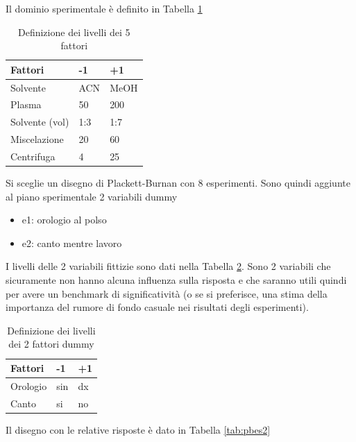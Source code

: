 \documentclass[
  11pt,
]{book}
\providecommand{\tightlist}{%
  \setlength{\itemsep}{0pt}\setlength{\parskip}{0pt}}
\begin{document}
Il dominio sperimentale è definito in Tabella \ref{tab:pbliv1}
\newpage

\begin{table}

\caption{\label{tab:pbliv1}Definizione dei livelli dei 5 fattori}
\centering
\begin{tabular}[t]{l|l|l}
\hline
Fattori & -1 & +1\\
\hline
Solvente & ACN & MeOH\\
\hline
Plasma & 50 & 200\\
\hline
Solvente (vol) & 1:3 & 1:7\\
\hline
Miscelazione & 20 & 60\\
\hline
Centrifuga & 4 & 25\\
\hline
\end{tabular}
\end{table}

Si sceglie un disegno di Plackett-Burnan con 8 esperimenti. Sono quindi aggiunte al piano sperimentale 2 variabili dummy

\begin{itemize}
\tightlist
\item
  e1: orologio al polso
\item
  e2: canto mentre lavoro
\end{itemize}

I livelli delle 2 variabili fittizie sono dati nella Tabella \ref{tab:dummy1}. Sono 2 variabili che sicuramente non hanno alcuna influenza sulla risposta e che saranno utili quindi per avere un benchmark di significatività (o se si preferisce, una stima della importanza del rumore di fondo casuale nei risultati degli esperimenti).

\begin{table}

\caption{\label{tab:dummy1}Definizione dei livelli dei 2 fattori  dummy}
\centering
\begin{tabular}[t]{l|l|l}
\hline
Fattori & -1 & +1\\
\hline
Orologio & sin & dx\\
\hline
Canto & si & no\\
\hline
\end{tabular}
\end{table}

Il disegno con le relative risposte è dato in Tabella \ref{tab:pbes2}
\newpage
\end{document}
